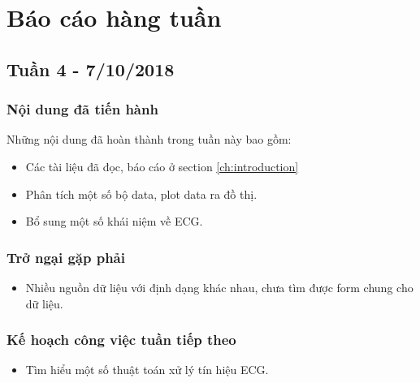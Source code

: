 \chapter*{Báo cáo hàng tuần}
\section{Tuần 4 - 7/10/2018}
\subsection{Nội dung đã tiến hành}
Những nội dung đã hoàn thành trong tuần này bao gồm:
\begin{itemize}
\item Các tài liệu đã đọc, báo cáo ở section \ref{ch:introduction}
\item Phân tích một số bộ data, plot data ra đồ thị.
\item Bổ sung một số khái niệm về ECG.
\end{itemize}

\subsection{Trở ngại gặp phải}
\begin{itemize}
    \item Nhiều nguồn dữ liệu với định dạng khác nhau, chưa tìm được form chung cho dữ liệu.
\end{itemize}

\subsection{Kế hoạch công việc tuần tiếp theo}
\begin{itemize}
    \item Tìm hiểu một số thuật toán xử lý tín hiệu ECG.
\end{itemize}
